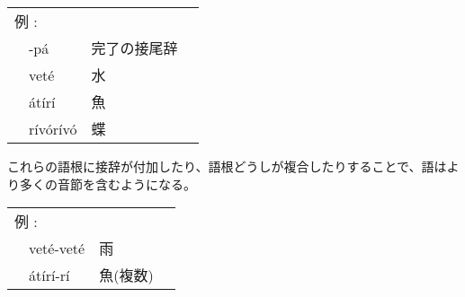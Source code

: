 \begin{tabular}{llll}
    \multicolumn{2}{l}{例 : } \\ 
    & -p\'a & 完了の接尾辞 \\
    & vet\'e & 水 \\
    & \'at\'ir\'i & 魚 \\
    & r\'iv\'or\'iv\'o & 蝶 \\
\end{tabular}

これらの語根に接辞が付加したり、語根どうしが複合したりすることで、語はより多くの音節を含むようになる。

\begin{tabular}{llll}
    \multicolumn{2}{l}{例 : } \\ 
    & vet\'e-vet\'e & 雨 \\
    & \'at\'ir\'i-r\'i & 魚(複数) \\
\end{tabular}